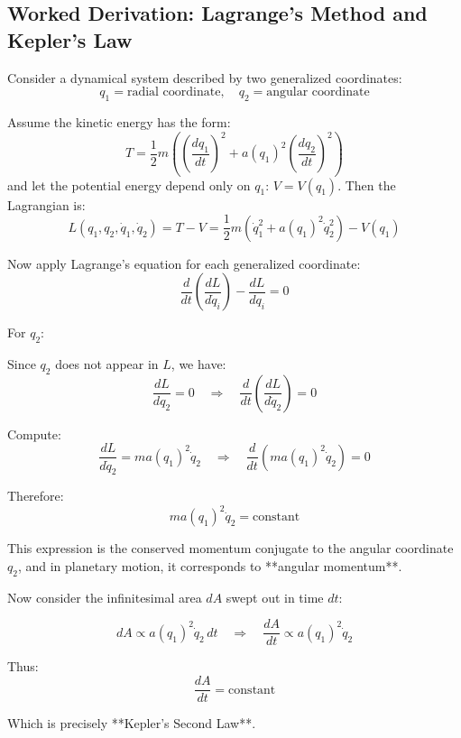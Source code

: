\subsection{Worked Derivation: Lagrange’s Method and Kepler’s Law}

Consider a dynamical system described by two generalized coordinates:
\[
q_1 = \text{radial coordinate}, \quad q_2 = \text{angular coordinate}
\]

Assume the kinetic energy has the form:
\[
T = \frac{1}{2} m \left( \left( \frac{dq_1}{dt} \right)^2 + a(q_1)^2 \left( \frac{dq_2}{dt} \right)^2 \right)
\]
and let the potential energy depend only on \( q_1 \): \( V = V(q_1) \). Then the Lagrangian is:
\[
L(q_1, q_2, \dot{q}_1, \dot{q}_2) = T - V = \frac{1}{2} m \left( \dot{q}_1^2 + a(q_1)^2 \dot{q}_2^2 \right) - V(q_1)
\]

Now apply Lagrange’s equation for each generalized coordinate:
\[
\frac{d}{dt} \left( \frac{dL}{d\dot{q}_i} \right) - \frac{dL}{dq_i} = 0
\]

For \( q_2 \):

Since \( q_2 \) does not appear in \( L \), we have:
\[
\frac{dL}{dq_2} = 0 \quad \Rightarrow \quad \frac{d}{dt} \left( \frac{dL}{d\dot{q}_2} \right) = 0
\]

Compute:
\[
\frac{dL}{d\dot{q}_2} = m a(q_1)^2 \dot{q}_2
\quad \Rightarrow \quad
\frac{d}{dt} \left( m a(q_1)^2 \dot{q}_2 \right) = 0
\]

Therefore:
\[
m a(q_1)^2 \dot{q}_2 = \text{constant}
\]

This expression is the conserved momentum conjugate to the angular coordinate \( q_2 \), and in planetary motion, it corresponds to **angular momentum**.

Now consider the infinitesimal area \( dA \) swept out in time \( dt \):

\[
dA \propto a(q_1)^2 \dot{q}_2 \, dt \quad \Rightarrow \quad \frac{dA}{dt} \propto a(q_1)^2 \dot{q}_2
\]

Thus:
\[
\frac{dA}{dt} = \text{constant}
\]

Which is precisely **Kepler’s Second Law**.

